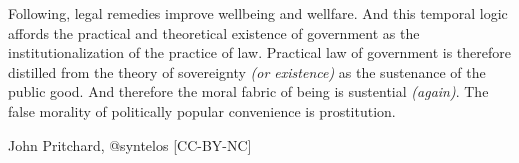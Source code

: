 Following, legal remedies improve wellbeing and wellfare.  And this
temporal logic affords the practical and theoretical existence of
government as the institutionalization of the practice of law.
Practical law of government is therefore distilled from the theory of
sovereignty {\it (or existence)}\/ as the sustenance of the public
good.  And therefore the moral fabric of being is sustential {\it
(again)}\/.  The false morality of politically popular convenience is
prostitution.  

{\tail John Pritchard, @syntelos [CC-BY-NC]}


\bye
